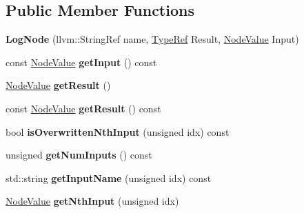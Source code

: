 \subsection*{Public Member Functions}
\begin{DoxyCompactItemize}
\item 
\mbox{\label{classglow_1_1_log_node_a90871be432b3e717f9a0d85511cdad3a}} 
{\bfseries Log\+Node} (llvm\+::\+String\+Ref name, \hyperlink{structglow_1_1_type}{Type\+Ref} Result, \hyperlink{structglow_1_1_node_value}{Node\+Value} Input)
\item 
\mbox{\label{classglow_1_1_log_node_a671cf462ebd676ba3d7ba7353d4a9c8c}} 
const \hyperlink{structglow_1_1_node_value}{Node\+Value} {\bfseries get\+Input} () const
\item 
\mbox{\label{classglow_1_1_log_node_a743dfd7417c86bdffde099ca94a7847d}} 
\hyperlink{structglow_1_1_node_value}{Node\+Value} {\bfseries get\+Result} ()
\item 
\mbox{\label{classglow_1_1_log_node_a46f2904467eb1b2efc71f27d16091e2b}} 
const \hyperlink{structglow_1_1_node_value}{Node\+Value} {\bfseries get\+Result} () const
\item 
\mbox{\label{classglow_1_1_log_node_a6da42bb0aceb564ac6930d4e5190b231}} 
bool {\bfseries is\+Overwritten\+Nth\+Input} (unsigned idx) const
\item 
\mbox{\label{classglow_1_1_log_node_abfa286272eb8ea716a0e7018248e278f}} 
unsigned {\bfseries get\+Num\+Inputs} () const
\item 
\mbox{\label{classglow_1_1_log_node_a462b5eafea33cd3452db4ee1362cf3d2}} 
std\+::string {\bfseries get\+Input\+Name} (unsigned idx) const
\item 
\mbox{\label{classglow_1_1_log_node_af7ff78b455e81b48a74716bd03a6a9d3}} 
\hyperlink{structglow_1_1_node_value}{Node\+Value} {\bfseries get\+Nth\+Input} (unsigned idx)
\item 
\mbox{\label{classglow_1_1_log_node_ae74b2e5fd7adeb39a00418fcf0dc867b}} 

\end{DoxyCompactItemize}
